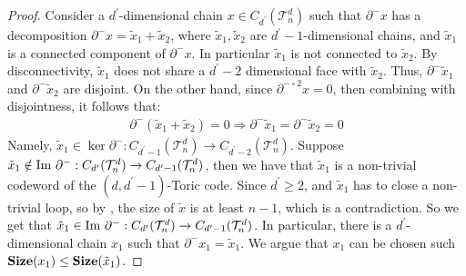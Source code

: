 \begin{proof}
  Consider a $d^{\prime}$-dimensional chain $x \in C_{d^{\prime}}(\mathcal{T}_n^d)$ such that $\partial^{-} x$ has a decomposition $\partial^{-}x = \tilde{x}_{1} + \tilde{x}_{2}$, where $\tilde{x}_{1}, \tilde{x}_{2}$ are $d^{\prime}-1$-dimensional chains, and $\tilde{x}_{1}$ is a connected component of $\partial^{-}x$. In particular $\tilde{x}_{1}$ is not connected to $\tilde{x}_{2}$. By disconnectivity, $\tilde{x}_{1}$ does not share a $d^{\prime}-2$ dimensional face with $\tilde{x}_{2}$. Thus, $\partial^{-} \tilde{x}_{1}$ and $\partial^{-} \tilde{x}_{2}$ are disjoint. On the other hand, since $\partial^{- \circ 2} x = 0$, then combining with disjointness, it follows that:
  \begin{equation*}
    \begin{split}
      \partial^{-}( \tilde{x}_{1} + \tilde{x}_{2} ) = 0 \Rightarrow \partial^{-} \tilde{x}_{1} = \partial^{-}\tilde{x}_{2} = 0 
    \end{split}
  \end{equation*}  Namely, $\tilde{x}_{1} \in \ker \partial^{-} : C_{d^{\prime}-1}(\mathcal{T}_n^d) \rightarrow C_{d^{\prime}-2}(\mathcal{T}_n^d)$.
Suppose $\tilde{x}_{1} \notin \text{Im } \partial^{-} : C_{d^{\prime}}(\mathcal{T}_n^d) \rightarrow C_{d^{\prime}-1}(\mathcal{T}_n^d)$, then we have that $\tilde{x}_{1}$ is a non-trivial codeword of the $(d,d^{\prime}-1)$-Toric code. 
Since $d^{\prime} \ge 2$, and $\tilde{x}_{1}$ has to close a non-trivial loop, so by , the size of $\tilde{x}$ is at least $n-1$, which is a contradiction. So we get that $\tilde{x}_{1}\in \text{Im } \partial^{-} : C_{d^{\prime}}(\mathcal{T}_n^d) \rightarrow C_{d^{\prime}-1}(\mathcal{T}_n^d)$. In particular, there is a $d^{\prime}$-dimensional chain $x_{1}$ such that $\partial^{-}x_{1} = \tilde{x}_{1}$. We argue that $x_{1}$ can be chosen such $\mathbf{Size}(x_{1}) \le \mathbf{Size}(\tilde{x}_{1})$.



\end{proof}
